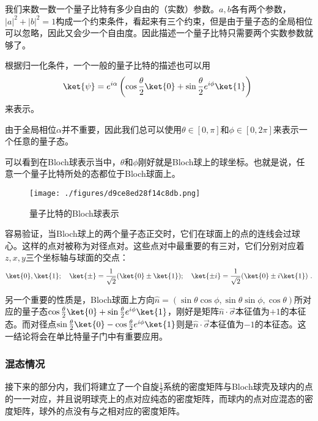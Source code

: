 我们来数一数一个量子比特有多少自由的（实数）参数。$a,b$各有两个参数，$|a|^2+|b|^2=1$构成一个约束条件，看起来有三个约束，但是由于量子态的全局相位可以忽略，因此又会少一个自由度。因此描述一个量子比特只需要两个实数参数就够了。

根据归一化条件，一个一般的量子比特的描述也可以用
\begin{equation}
\ket{\psi}=e^{i\alpha}\left(\cos\frac{\theta}{2}\ket{0}+\sin\frac{\theta}{2}e^{i\phi}\ket{1}\right)~
\end{equation}
来表示。

由于全局相位$\alpha$并不重要，因此我们总可以使用$\theta\in[0,\pi]$和$\phi\in[0,2\pi]$来表示一个任意的量子态。

可以看到在Bloch球表示当中，$\theta$和$\phi$刚好就是Bloch球上的球坐标。也就是说，任意一个量子比特所处的态都位于Bloch球面上。

\begin{figure}[ht]
\centering
\texttt{[image: ./figures/d9ce8ed28f14c8db.png]}
\caption{量子比特的Bloch球表示} \label{fig_Qubit}
\end{figure}

容易验证，当Bloch球上的两个量子态正交时，它们在球面上的点的连线会过球心。这样的点对被称为对径点对。这些点对中最重要的有三对，它们分别对应着$z,x,y$三个坐标轴与球面的交点：
\begin{equation}
\ket{0},\ket{1};\quad \ket{\pm}=\frac{1}{\sqrt{2}}(\ket{0}\pm\ket{1});\quad \ket{\pm i}=\frac{1}{\sqrt{2}}(\ket{0}\pm i\ket{1})~.
\end{equation}

另一个重要的性质是，Bloch球面上方向$\hat{n}=(\sin\theta\cos\phi,\sin\theta\sin\phi,\cos\theta)$所对应的量子态$\cos\frac{\theta}{2}\ket{0}+\sin\frac{\theta}{2}e^{i\phi}\ket{1}$，刚好是矩阵$\hat{n}\cdot\vec{\sigma}$本征值为$+1$的本征态。而对径点$\sin\frac{\theta}{2}\ket{0}-\cos\frac{\theta}{2}e^{i\phi}\ket{1}$则是$\hat{n}\cdot\vec{\sigma}$本征值为$-1$的本征态。这一结论将会在单比特量子门中有重要应用。

\subsubsection{混态情况}

接下来的部分内，我们将建立了一个自旋$\frac{1}{2}$系统的密度矩阵与Bloch球壳及球内的点的一一对应，并且说明球壳上的点对应纯态的密度矩阵，而球内的点对应混态的密度矩阵，球外的点没有与之相对应的密度矩阵。


